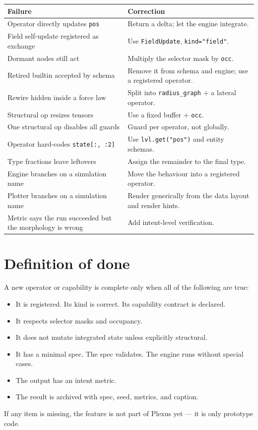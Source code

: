 \documentclass[11pt]{article}
\newcommand{\code}[1]{\texttt{#1}}
\begin{document}
\begin{center}
\renewcommand{\arraystretch}{1.25}
\footnotesize
\begin{tabular}{@{}p{4.6cm}p{7.4cm}@{}}
\toprule
\textbf{Failure} & \textbf{Correction} \\
\midrule
Operator directly updates \code{pos} & Return a delta; let the engine integrate. \\
Field self-update registered as exchange & Use \code{FieldUpdate}, \code{kind="field"}. \\
Dormant nodes still act & Multiply the selector mask by \code{occ}. \\
Retired builtin accepted by schema & Remove it from schema and engine; use a registered operator. \\
Rewire hidden inside a force law & Split into \code{radius\_graph} $+$ a lateral operator. \\
Structural op resizes tensors & Use a fixed buffer $+$ \code{occ}. \\
One structural op disables all guards & Guard per operator, not globally. \\
Operator hard-codes \code{state[:, :2]} & Use \code{lvl.get("pos")} and entity schemas. \\
Type fractions leave leftovers & Assign the remainder to the final type. \\
Engine branches on a simulation name & Move the behaviour into a registered operator. \\
Plotter branches on a simulation name & Render generically from the data layout and render hints. \\
Metric says the run succeeded but the morphology is wrong & Add intent-level verification. \\
\bottomrule
\end{tabular}
\end{center}

\section{Definition of done}

A new operator or capability is complete only when all of the following are true:
\begin{itemize}\itemsep2pt
\item It is registered. Its kind is correct. Its capability contract is declared.
\item It respects selector masks and occupancy.
\item It does not mutate integrated state unless explicitly structural.
\item It has a minimal spec. The spec validates. The engine runs without special cases.
\item The output has an intent metric.
\item The result is archived with spec, seed, metrics, and caption.
\end{itemize}
If any item is missing, the feature is not part of Plexus yet --- it is only
prototype code.
\end{document}

